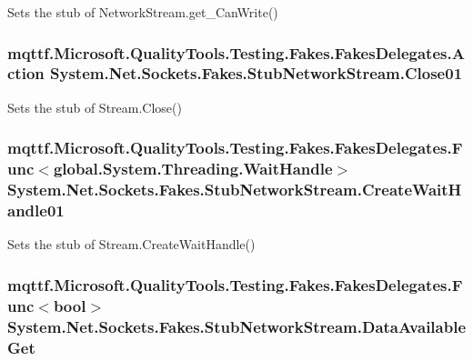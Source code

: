 Sets the stub of Network\-Stream.\-get\-\_\-\-Can\-Write()

\hypertarget{class_system_1_1_net_1_1_sockets_1_1_fakes_1_1_stub_network_stream_abde298ecda81c90b405ca4c33c33c708}{
\subsubsection[{Close01}]{\setlength{\rightskip}{0pt plus 5cm}mqttf.\-Microsoft.\-Quality\-Tools.\-Testing.\-Fakes.\-Fakes\-Delegates.\-Action System.\-Net.\-Sockets.\-Fakes.\-Stub\-Network\-Stream.\-Close01}}\label{class_system_1_1_net_1_1_sockets_1_1_fakes_1_1_stub_network_stream_abde298ecda81c90b405ca4c33c33c708}


Sets the stub of Stream.\-Close()

\hypertarget{class_system_1_1_net_1_1_sockets_1_1_fakes_1_1_stub_network_stream_ad431d17e3abb2ab657ad1e610039fd33}{
\subsubsection[{Create\-Wait\-Handle01}]{\setlength{\rightskip}{0pt plus 5cm}mqttf.\-Microsoft.\-Quality\-Tools.\-Testing.\-Fakes.\-Fakes\-Delegates.\-Func$<$global.\-System.\-Threading.\-Wait\-Handle$>$ System.\-Net.\-Sockets.\-Fakes.\-Stub\-Network\-Stream.\-Create\-Wait\-Handle01}}\label{class_system_1_1_net_1_1_sockets_1_1_fakes_1_1_stub_network_stream_ad431d17e3abb2ab657ad1e610039fd33}


Sets the stub of Stream.\-Create\-Wait\-Handle()

\hypertarget{class_system_1_1_net_1_1_sockets_1_1_fakes_1_1_stub_network_stream_a80472e11e8e2899d3ed3ba4c75589400}{
\subsubsection[{Data\-Available\-Get}]{\setlength{\rightskip}{0pt plus 5cm}mqttf.\-Microsoft.\-Quality\-Tools.\-Testing.\-Fakes.\-Fakes\-Delegates.\-Func$<$bool$>$ System.\-Net.\-Sockets.\-Fakes.\-Stub\-Network\-Stream.\-Data\-Available\-Get}}\label{class_system_1_1_net_1_1_sockets_1_1_fakes_1_1_stub_network_stream_a80472e11e8e2899d3ed3ba4c75589400}


